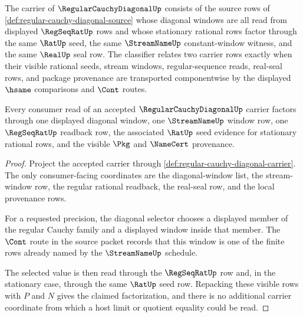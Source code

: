 \begin{definition}
\label{def:regular-cauchy-diagonal-carrier}
The carrier of $\RegularCauchyDiagonalUp$ consists of the source rows of \autoref{def:regular-cauchy-diagonal-source} whose diagonal windows are all read from displayed $\RegSeqRatUp$ rows and whose stationary rational rows factor through the same $\RatUp$ seed, the same $\StreamNameUp$ constant-window witness, and the same $\RealUp$ seal row. The classifier relates two carrier rows exactly when their visible rational seeds, stream windows, regular-sequence reads, real-seal rows, and package provenance are transported componentwise by the displayed $\hsame$ comparisons and $\Cont$ routes.
\end{definition}

\begin{theorem}
\label{thm:regular-cauchy-diagonal-window-coverage}
Every consumer read of an accepted $\RegularCauchyDiagonalUp$ carrier factors through one displayed diagonal window, one $\StreamNameUp$ window row, one $\RegSeqRatUp$ readback row, the associated $\RatUp$ seed evidence for stationary rational rows, and the visible $\Pkg$ and $\NameCert$ provenance.
\end{theorem}
\begin{proof}
Project the accepted carrier through \autoref{def:regular-cauchy-diagonal-carrier}. The only consumer-facing coordinates are the diagonal-window list, the stream-window row, the regular rational readback, the real-seal row, and the local provenance rows.

For a requested precision, the diagonal selector chooses a displayed member of the regular Cauchy family and a displayed window inside that member. The $\Cont$ route in the source packet records that this window is one of the finite rows already named by the $\StreamNameUp$ schedule.

The selected value is then read through the $\RegSeqRatUp$ row and, in the stationary case, through the same $\RatUp$ seed row. Repacking these visible rows with $P$ and $N$ gives the claimed factorization, and there is no additional carrier coordinate from which a host limit or quotient equality could be read.
\end{proof}

